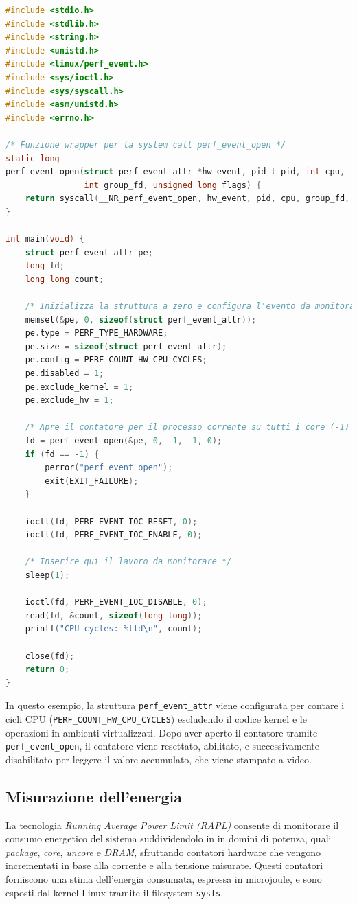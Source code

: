 \documentclass{article}
\begin{document}
\begin{lstlisting}[language=C, caption={Esempio di utilizzo di \texttt{perf\_event\_open} per contare i cicli CPU}]
#include <stdio.h>
#include <stdlib.h>
#include <string.h>
#include <unistd.h>
#include <linux/perf_event.h>
#include <sys/ioctl.h>
#include <sys/syscall.h>
#include <asm/unistd.h>
#include <errno.h>

/* Funzione wrapper per la system call perf_event_open */
static long
perf_event_open(struct perf_event_attr *hw_event, pid_t pid, int cpu,
                int group_fd, unsigned long flags) {
    return syscall(__NR_perf_event_open, hw_event, pid, cpu, group_fd, flags);
}

int main(void) {
    struct perf_event_attr pe;
    long fd;
    long long count;

    /* Inizializza la struttura a zero e configura l'evento da monitorare */
    memset(&pe, 0, sizeof(struct perf_event_attr));
    pe.type = PERF_TYPE_HARDWARE;
    pe.size = sizeof(struct perf_event_attr);
    pe.config = PERF_COUNT_HW_CPU_CYCLES;
    pe.disabled = 1;
    pe.exclude_kernel = 1;
    pe.exclude_hv = 1;

    /* Apre il contatore per il processo corrente su tutti i core (-1) */
    fd = perf_event_open(&pe, 0, -1, -1, 0);
    if (fd == -1) {
        perror("perf_event_open");
        exit(EXIT_FAILURE);
    }

    ioctl(fd, PERF_EVENT_IOC_RESET, 0);
    ioctl(fd, PERF_EVENT_IOC_ENABLE, 0);

    /* Inserire qui il lavoro da monitorare */
    sleep(1);

    ioctl(fd, PERF_EVENT_IOC_DISABLE, 0);
    read(fd, &count, sizeof(long long));
    printf("CPU cycles: %lld\n", count);

    close(fd);
    return 0;
}
\end{lstlisting}

In questo esempio, la struttura \texttt{perf\_event\_attr} viene configurata per contare i cicli CPU (\texttt{PERF\_COUNT\_HW\_CPU\_CYCLES}) escludendo il codice kernel e le operazioni in ambienti virtualizzati. Dopo aver aperto il contatore tramite \texttt{perf\_event\_open}, il contatore viene resettato, abilitato, e successivamente disabilitato per leggere il valore accumulato, che viene stampato a video.

\subsection{Misurazione dell'energia}
La tecnologia \emph{Running Average Power Limit (RAPL)} consente di monitorare il consumo energetico del sistema suddividendolo in in domini di potenza, quali \textit{package}, \textit{core}, \textit{uncore} e \textit{DRAM},  sfruttando contatori hardware che vengono incrementati in base alla corrente e alla tensione misurate. Questi contatori forniscono una stima dell'energia consumata, espressa in microjoule, e sono esposti dal kernel Linux tramite il filesystem \texttt{sysfs}.
\end{document}
